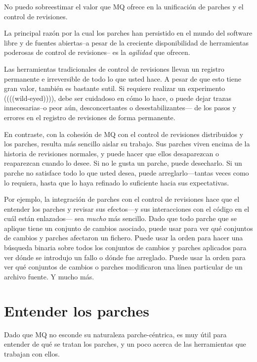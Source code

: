 No puedo sobreestimar el valor que MQ ofrece en la unificación de
parches y el control de revisiones.

La principal razón por la cual los parches han persistido en el mundo
del software libre y de fuentes abiertas--a pesar de la creciente
disponibilidad de herramientas poderosas de control de revisiones-- es
la \emph{agilidad} que ofrecen.

Las herramientas tradicionales de control de revisiones llevan un
registro permanente e irreversible de todo lo que usted hace.  A pesar
de que esto tiene gran valor, también es bastante sutil.  Si requiere
realizar un experimento ((((wild-eyed)))), debe ser cuidadoso en cómo
lo hace, o puede dejar trazas innecesarias--o peor aún,
desconcertantes o desestabilizantes--- de los pasos y errores en el
registro de revisiones de forma permanente.

En contraste, con la cohesión de MQ con el control de revisiones
distribuidos y los parches, resulta más sencillo aislar su trabajo.
Sus parches viven encima de la historia de revisiones normales, y
puede hacer que ellos desaparezcan o reaparezcan cuando lo desee.  Si
no le gusta un parche, puede desecharlo.  Si un parche no satisface
todo lo que usted desea, puede arreglarlo---tantas veces como lo
requiera, hasta que lo haya refinado lo suficiente hacia sus
expectativas.

Por ejemplo, la integración de parches con el control de revisiones
hace que el entender los parches y revisar sus efectos---y sus
interacciones con el código en el cuál están enlazados--- sea
\emph{mucho} más sencillo.  Dado que todo parche que se aplique tiene
un conjunto de cambios asociado, puede usar
 para ver qué conjuntos de cambios y
parches afectaron un fichero.  Puede usar la orden  para
hacer una búsqueda binaria sobre todos los conjuntos de cambios y
parches aplicados para ver dónde se introdujo un fallo o dónde fue
arreglado.  Puede usar la orden  para ver qué
conjuntos de cambios o parches modificaron una línea particular de un
archivo fuente. Y mucho más.

\section{Entender los parches}
\label{sec:mq:patch}

Dado que MQ no esconde su naturaleza parche-céntrica, es muy útil para
entender de qué se tratan los parches, y un poco acerca de las
herramientas que trabajan con ellos.

